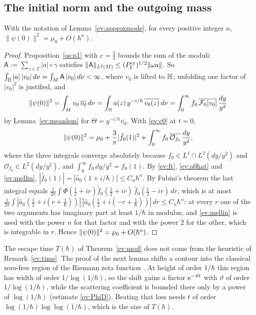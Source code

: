 \subsection{The initial norm and the outgoing mass}\label{subsec:ev-outgoing}
\begin{lemma}\label{ev:initialnorm}
With the notation of Lemma~\ref{ev:approxmode}, for every positive integer $n$, $\|\psi(0)\|^2=\mu_0+O(\hbar^n)$.
\end{lemma}
\begin{proof} Proposition~\ref{os:p1} with $c=\tfrac34$ bounds the sum of the moduli:
$\mathsf A:=\sum_{\gamma\in\Gamma}|a|\circ\gamma$ satisfies $\lVert \mathsf A\rVert_{L^2(M)}\le(P^{\mathrm{cr}}_\Gamma)^{1/2}\lVert \omega a\rVert$. So
$\int_{\mathbb{H}}|a|\,|v_0|\,d\nu=\int_M\mathsf A\,|v_0|\,d\nu<\infty$, where $v_0$ is lifted to $\mathbb{H}$; unfolding one factor of $|v_0|^2$ is justified, and
\[
  \lVert \psi(0)\rVert^2=\int_Mv_0\,\overline{v_0}\,d\nu=\int_{\mathbb{H}} a(z)\,y^{-i/\hbar}\,\overline{v_0(z)}\,d\nu=\int_0^\infty f_0\,\overline{\mathcal F_0[v_0]}\,\frac{dy}{y^2}
\]
by Lemma~\ref{ev:meanlem} for $\Theta=y^{-i/\hbar}\overline{v_0}$. With \eqref{ev:c0} at $t=0$,
\[
  \lVert \psi(0)\rVert^2=\mu_0+\frac3\pi|\hat f_0(1)|^2+\int_0^\infty f_0\,\overline{\mathcal O_{f_0}}\,\frac{dy}{y^2},
\]
where the three integrals converge absolutely because $f_0\in L^1\cap L^2(dy/y^2)$ and $\mathcal O_{f_0}\in L^2(dy/y^2)$, and $\int_0^\infty f_0\,dy/y^2=\hat f_0(1)$.
By \eqref{ev:ft}, \eqref{ev:a0hat} and \eqref{ev:mellin}, $|\hat f_0(1)|=|\hat a_0(1+i/\hbar)|\le C_n\hbar^n$. By Fubini's theorem the last integral equals
$\tfrac1{2\pi}\int\overline{\Phi(\tfrac12+ir)\hat f_0(\tfrac12+ir)}\,\hat f_0(\tfrac12-ir)\,dr$, which is at most
$\tfrac1{2\pi}\int|\hat a_0(\tfrac12+i(r+\tfrac1\hbar))|\,|\hat a_0(\tfrac12+i(-r+\tfrac1\hbar))|\,dr\le C_n\hbar^n$: at every $r$ one of the two arguments has
imaginary part at least $1/\hbar$ in modulus, and \eqref{ev:mellin} is used with the power $n$ for that factor and with the power $2$ for the
other, which is integrable in $r$. Hence $\lVert \psi(0)\rVert^2=\mu_0+O(\hbar^n)$.


\end{proof}

The escape time $T(\hbar)$ of Theorem~\ref{ev:mod} does not come from the heuristic of Remark~\ref{ev:time}. The proof of the
next lemma shifts a contour into the classical zero-free region of the Riemann zeta function \cite[Theorem~6.6]{MV07}. At
height of order $1/\hbar$ this region has width of order $1/\log(1/\hbar)$, so the shift gains a factor $\mathrm{e}^{-\vartheta t}$ with
$\vartheta$ of order $1/\log(1/\hbar)$, while the scattering coefficient is bounded there only by a power of $\log(1/\hbar)$
(estimate \eqref{ev:PhiD}). Beating that loss needs $t$ of order $\log(1/\hbar)\log\log(1/\hbar)$, which is the size of
$T(\hbar)$.

